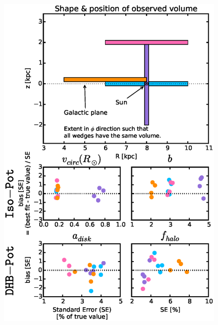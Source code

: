 \documentclass[iop,revtex4]{emulateapj}
\begin{document}
\begin{figure}[!htbp]
\centering
\includegraphics[width=\columnwidth]{figs/wedgesVol_bias_vs_SE.eps}

\end{figure}
\end{document}
